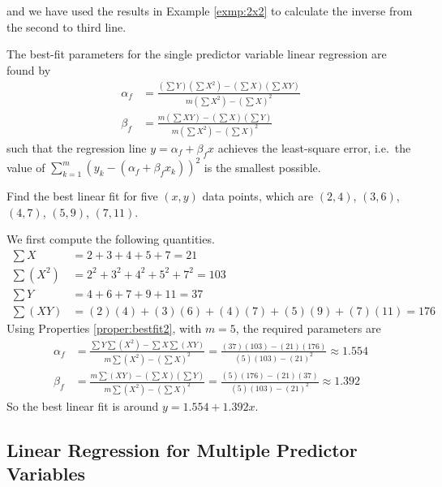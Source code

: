 and we have used the results in Example \ref{exmp:2x2} to calculate the inverse from the second to third line.
\begin{proper}
\label{proper:bestfit2}
The best-fit parameters for the single predictor variable linear regression are found by
\begin{align*}
\alpha_f &= \frac{(\sum Y) (\sum X^2) - (\sum X) (\sum XY)}{m(\sum X^2) - (\sum X)^2} \\
\beta_f &= \frac{m (\sum XY) - (\sum X) (\sum Y)}{m(\sum X^2) - (\sum X)^2}
\end{align*}
such that the regression line $y = \alpha_f + \beta_f x$ achieves the least-square error, i.e.\ the value of $\sum_{k=1}^m (y_k - (\alpha_f + \beta_f x_k))^2$ is the smallest possible.
\end{proper}
\begin{exmp}
\label{ex11.1.1}
Find the best linear fit for five $(x,y)$ data points, which are $(2,4)$, $(3,6)$, $(4,7)$, $(5,9)$, $(7,11)$.
\end{exmp}
\begin{solution}
We first compute the following quantities.
\begin{align*}
\sum X &= 2+3+4+5+7 = 21 \\
\sum(X^2) &= 2^2+3^2+4^2+5^2+7^2 = 103 \\
\sum Y &= 4+6+7+9+11 = 37 \\
\sum (XY) &= (2)(4)+(3)(6)+(4)(7)+(5)(9)+(7)(11) = 176
\end{align*}
Using Properties \ref{proper:bestfit2}, with $m=5$, the required parameters are
\begin{align*}
\alpha_f &= \frac{\sum Y \sum (X^2) - \sum X \sum (XY)}{m\sum(X^2) - (\sum X)^2} = \frac{(37)(103)-(21)(176)}{(5)(103)-(21)^2} \approx 1.554 \\
\beta_f &= \frac{m \sum(XY) - (\sum X) (\sum Y)}{m\sum(X^2) - (\sum X)^2} = \frac{(5)(176)-(21)(37)}{(5)(103)-(21)^2} \approx 1.392
\end{align*}
So the best linear fit is around $y = 1.554 + 1.392x$.
\end{solution}

\subsection{Linear Regression for Multiple Predictor Variables}

